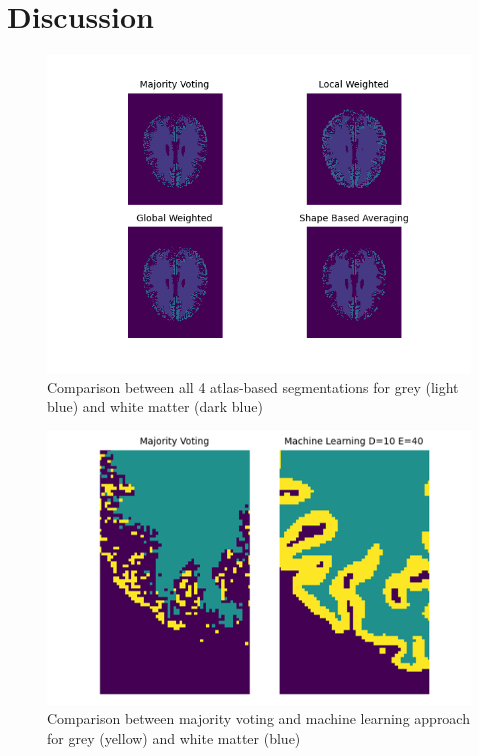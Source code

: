 \section*{Discussion}

\begin{figure}[h!]
	\centering
	\includegraphics[width=0.8\linewidth]{img/compareSegmentationSlice}
	\caption{Comparison between all 4 atlas-based segmentations for grey (light blue) and white matter (dark blue)}
	\label{fig:compareSegmentationSlice}
\end{figure}

\begin{figure}[h!]
	\centering
	\includegraphics[width=0.8\linewidth]{img/compareGreyMatter}
	\caption{Comparison between majority voting and machine learning approach for grey (yellow) and white matter (blue)}
	\label{fig:compareGreyMatter}
\end{figure}